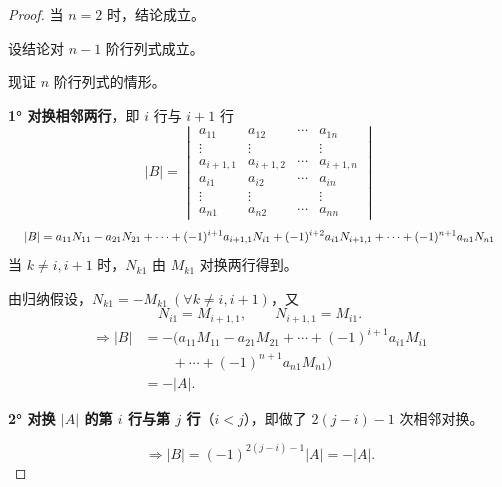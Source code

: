 \begin{proof}
当 $n=2$ 时，结论成立。

设结论对 $n-1$ 阶行列式成立。

现证 $n$ 阶行列式的情形。

\textbf{1° 对换相邻两行}，即 $i$ 行与 $i+1$ 行
\[
|B|=\begin{vmatrix}
a_{11} & a_{12} & \cdots & a_{1n}\\
\vdots & \vdots & & \vdots\\
a_{i+1,1} & a_{i+1,2} & \cdots & a_{i+1,n}\\
a_{i1} & a_{i2} & \cdots & a_{in}\\
\vdots & \vdots & & \vdots\\
a_{n1} & a_{n2} & \cdots & a_{nn}
\end{vmatrix}
\]
\[
\resizebox{0.98\linewidth}{!}{$\displaystyle
|B|=a_{11}N_{11}-a_{21}N_{21}+\cdots+(-1)^{i+1}a_{i+1,1}N_{i1}+(-1)^{i+2}a_{i1}N_{i+1,1}+\cdots+(-1)^{n+1}a_{n1}N_{n1}$}
\]
当 $k\ne i,i+1$ 时，$N_{k1}$ 由 $M_{k1}$ 对换两行得到。


由归纳假设，$N_{k1}=-M_{k1}\ (\forall k\ne i,i+1)$，又
\[
N_{i1}=M_{i+1,1},\qquad N_{i+1,1}=M_{i1}.
\]
\begin{align*}
\Rightarrow|B|&=-\Big(a_{11}M_{11}-a_{21}M_{21}+\cdots+(-1)^{i+1}a_{i1}M_{i1}\\
&\qquad+\cdots+(-1)^{n+1}a_{n1}M_{n1}\Big)\\
&=-|A|.
\end{align*}

\textbf{2° 对换 $|A|$ 的第 $i$ 行与第 $j$ 行}（$i<j$），即做了 $2(j-i)-1$ 次相邻对换。
\begin{center}
\end{center}
\[
\Rightarrow|B|=(-1)^{2(j-i)-1}|A|=-|A|.
\]
\end{proof}


